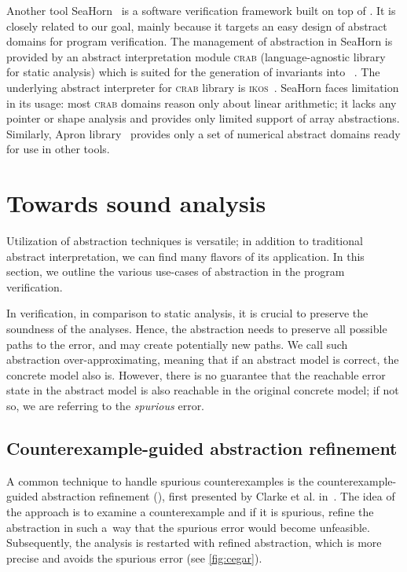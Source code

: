 Another tool SeaHorn~\cite{Gurfinkel2015} is a software verification framework
built on top of \llvm.  It is closely related to our goal, mainly because it
targets an easy design of abstract domains for program verification. The
management of abstraction in SeaHorn is provided by an abstract interpretation
module \textsc{crab} (language-agnostic library for static analysis) which is
suited for the generation of invariants into \llvm~\cite{Gershuni2019}. The
underlying abstract interpreter for \textsc{crab} library is
\textsc{ikos}~\cite{Ikos}. SeaHorn faces limitation in its usage: most
\textsc{crab} domains reason only about linear arithmetic; it lacks any pointer
or shape analysis and provides only limited support of array abstractions.
Similarly, Apron library~\cite{Jeannet2009} provides only a set of numerical
abstract domains ready for use in other tools.

\section{Towards sound analysis}
\label{sec:techniques}

Utilization of abstraction techniques is versatile; in addition to traditional
abstract interpretation, we can find many flavors of its application. In this
section, we outline the various use-cases of abstraction in the program
verification.

In verification, in comparison to static analysis, it is crucial to preserve
the soundness of the analyses. Hence, the abstraction needs to preserve all
possible paths to the error, and may create potentially new paths. We call such
abstraction over-approximating, meaning that if an abstract model is correct,
the concrete model also is.  However, there is no guarantee that the reachable
error state in the abstract model is also reachable in the original concrete
model; if not so, we are referring to the \emph{spurious} error.

\subsection{Counterexample-guided abstraction refinement}

A common technique to handle spurious coun\-ter\-examples is the
coun\-ter\-example-guided abstraction refinement (\cegar), first presented by
Clarke et al.  in~\cite{Clarke2000}. The idea of the \cegar approach is to
examine a counterexample and if it is spurious, refine the abstraction in such
a~way that the spurious error would become unfeasible. Subsequently, the
analysis is restarted with refined abstraction, which is more precise and
avoids the spurious error (see \autoref{fig:cegar}).

